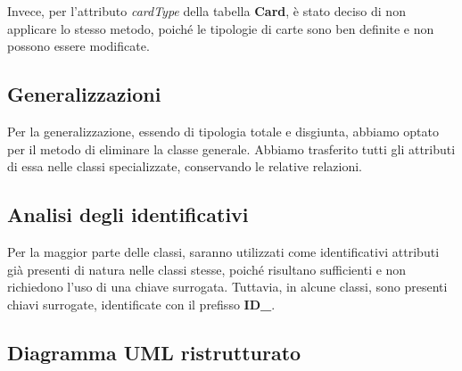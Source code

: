 Invece, per l'attributo \textit{cardType} della tabella \textbf{Card},
è stato deciso di non applicare lo stesso metodo, poiché le tipologie
di carte sono ben definite e non possono essere modificate.

\subsection{Generalizzazioni}

Per la generalizzazione, essendo di tipologia totale e disgiunta,
abbiamo optato per il metodo di eliminare la classe generale.
Abbiamo trasferito tutti gli attributi di essa nelle
classi specializzate, conservando le relative relazioni.

\subsection{Analisi degli identificativi}

Per la maggior parte delle classi, saranno utilizzati come identificativi
attributi già presenti di natura nelle classi stesse, poiché risultano
sufficienti e non richiedono l'uso di una chiave surrogata.
Tuttavia, in alcune classi, sono presenti chiavi surrogate,
identificate con il prefisso \textbf{ID\_}.

\newpage
\subsection{Diagramma UML ristrutturato}

